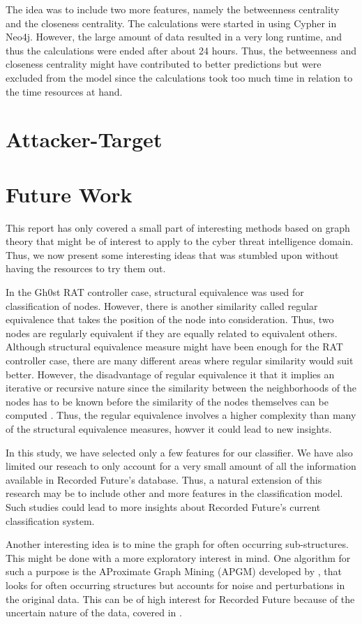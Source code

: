 The idea was to include two more features, namely the betweenness centrality and the closeness centrality. The calculations were started in using Cypher in Neo4j. However, the large amount of data resulted in a very long runtime, and thus the calculations were ended after about 24 hours. Thus, the betweenness and closeness centrality might have contributed to better predictions but were excluded from the model since the calculations took too much time in relation to the time resources at hand. 

\section{Attacker-Target}

\section{Future Work}
This report has only covered a small part of interesting methods based on graph theory that might be of interest to apply to the cyber threat intelligence domain. Thus, we now present some interesting ideas that was stumbled upon without having the resources to try them out. 

In the Gh0st RAT controller case, structural equivalence was used for classification of nodes. However, there is another similarity called regular equivalence that takes the position of the node into consideration. Thus, two nodes are regularly equivalent if they are equally related to equivalent others. Although structural equivalence measure might have been enough for the RAT controller case, there are many different areas where regular similarity would suit better. However, the disadvantage of regular equivalence it that it implies an iterative or recursive nature since the similarity between the neighborhoods of the nodes has to be known before the similarity of the nodes themselves can be computed \cite{leicht2006}. Thus, the regular equivalence involves a higher complexity than many of the structural equivalence measures, howver it could lead to new insights. 

In this study, we have selected only a few features for our classifier. We have also limited our reseach to only account for a very small amount of all the information available in Recorded Future's database. Thus, a natural extension of this research may be to include other and more features in the classification model. Such studies could lead to more insights about Recorded Future's current classification system.

Another interesting idea is to mine the graph for often occurring sub-structures. This might be done with a more exploratory interest in mind. One algorithm for such a purpose is the AProximate Graph Mining (APGM) developed by \citet{Jia2011}, that looks for often occurring structures but accounts for noise and perturbations in the original data. This can be of high interest for Recorded Future because of the uncertain nature of the data, covered in .
